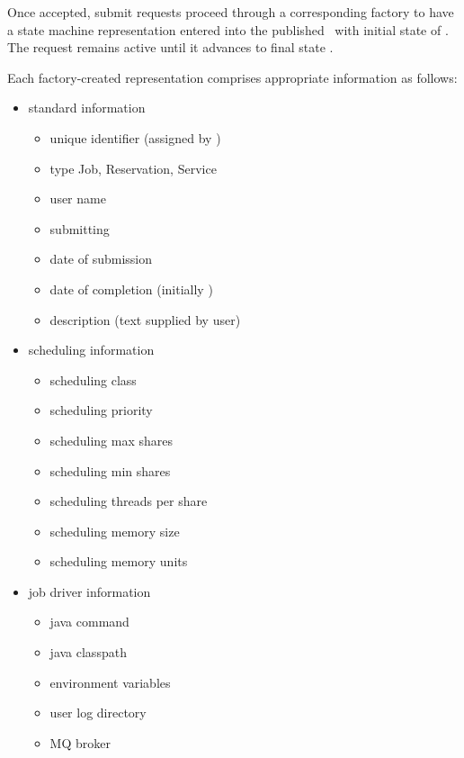     Once accepted, submit requests proceed through a corresponding factory
    to have a state machine representation entered into the published
    \varORmap~with initial state of \varReceived.  The request remains 
    active until it advances to final state \varCompleted.
    
    Each factory-created representation comprises appropriate information as follows:
    
    \begin{itemize}
    
      \begin{itemize}
      \item standard information
        \begin{itemize}
          \item unique identifier (assigned by \varDUCC)
          \item type {Job, Reservation, Service}
          \item user name
          \item submitting \varPID
          \item date of submission
          \item date of completion (initially \varNull)
          \item description (text supplied by user)
        \end{itemize} 
      \item scheduling information
        \begin{itemize}
          \item scheduling class
          \item scheduling priority
          \item scheduling max shares
          \item scheduling min shares
          \item scheduling threads per share
          \item scheduling memory size
          \item scheduling memory units
        \end{itemize} 
      \item job driver information
        \begin{itemize}
          \item java command
          \item java classpath
          \item environment variables
          \item user log directory
          \item MQ broker

\end{itemize}
\end{itemize}
\end{itemize}
